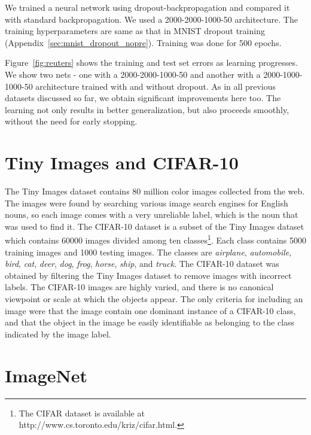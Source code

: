 \documentclass[12pt]{article}
\begin{document}
We trained a neural network using dropout-backpropagation and compared it with
standard backpropagation. We used a 2000-2000-1000-50 architecture. The training
hyperparameters are same as that in MNIST dropout training (Appendix~\ref{sec:mnist_dropout_nopre}). Training was done
for 500 epochs.

Figure~\ref{fig:reuters} shows the training and test set errors as learning
progresses. We show two nets - one with a 2000-2000-1000-50 and
another with a 2000-1000-1000-50 architecture trained with and without dropout.
As in all previous datasets discussed so far, we obtain significant improvements
here too. The learning not only results in better generalization, but also
proceeds smoothly, without the need for early stopping.


\section{Tiny Images and CIFAR-10}
\label{cifarsom}

The Tiny Images dataset contains 80 million  color images
collected from the web. The images were found by searching various
image search engines for English nouns, so each image comes with a
very unreliable label, which is the noun that was used to find it.
The CIFAR-10 dataset is a subset of the Tiny Images dataset which
contains 60000 images divided among ten classes\footnote{The CIFAR dataset is 
available at http://www.cs.toronto.edu/kriz/cifar.html. }. Each class contains
5000 training images and 1000 testing images. The classes are \emph{airplane},
\emph{automobile}, \emph{bird}, \emph{cat}, \emph{deer}, \emph{dog},
\emph{frog}, \emph{horse}, \emph{ship}, and \emph{truck}. The CIFAR-10
dataset was obtained by filtering the Tiny Images dataset to remove
images with incorrect labels. The CIFAR-10 images are highly varied,
and there is no canonical viewpoint or scale at which the objects
appear. The only criteria for including an image were that the image
contain one dominant instance of a CIFAR-10 class, and that the object
in the image be easily identifiable as belonging to the class indicated
by the image label. 


\section{ImageNet}
\label{imagenetsom}
\end{document}
